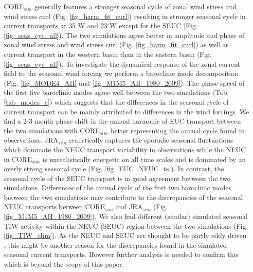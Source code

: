 \documentclass[os, manuscript]{copernicus}
\begin{document}
	CORE$_{sim}$ generally features a stronger seasonal cycle of zonal wind stress and wind stress curl (Fig. \ref{fig_harm_fit_curl}) resulting in stronger seasonal cycle in current transports at 35$^{\circ}$W and 23$^{\circ}$W except for the SEUC (Fig. \ref{fig_seas_cyc_all}). The two simulations agree better in amplitude and phase of zonal wind stress and wind stress curl (Fig. \ref{fig_harm_fit_curl}) as well as current transport in the western basin than in the eastern basin (Fig. \ref{fig_seas_cyc_all}). To investigate the dynamical response of the zonal current field to the seasonal wind forcing we perform a baroclinic mode decomposition (Fig. \ref{fig_MODE4_AH} and \ref{fig_M1M5_AH_1980_2009}). The phase speed of the first five baroclinic modes agree well between the two simulations (Tab. \ref{tab_modes_c}) which suggests that the differences in the seasonal cycle of current transport can be mainly attributed to differences in the wind forcings. We find a 2-3 month phase shift in the annual harmonic of EUC transport between the two simulations with CORE$_{sim}$ better representing the annual cycle found in observations. JRA$_{sim}$ realistically captures the sporadic seasonal fluctuations which dominate the NEUC transport variability in observations while the NEUC in CORE$_{sim}$ is unrealistically energetic on all time scales and is dominated by an overly strong seasonal cycle (Fig. \ref{fig_EUC_NEUC_ts}). In contrast, the seasonal cycle of the SEUC transport is in good agreement between the two simulations. Differences of the annual cycle of the first two baroclinic modes between the two simulations may contribute to the discrepancies of the seasonal NEUC transports between CORE$_{sim}$ and JRA$_{sim}$ (Fig. \ref{fig_M1M5_AH_1980_2009}). We also find different (similar) simulated seasonal TIW activity within the NEUC (SEUC) region between the two simulations (Fig. \ref{fig_TIW_clim}). As the NEUC and SEUC are thought to be partly eddy driven \citep[e.g.][]{Jochum2004b,Assene2020}, this might be another reason for the discrepancies found in the simulated seasonal current transports. However further analysis is needed to confirm this which is beyond the scope of this paper.  
	
\end{document}

